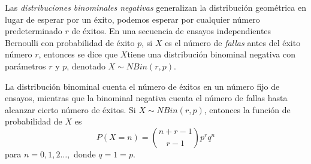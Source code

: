 Las \emph{distribuciones binominales negativas} generalizan la distribución geométrica en lugar de esperar por un éxito, podemos esperar por cualquier número predeterminado $r$ de éxitos. En una secuencia de ensayos independientes Bernoulli con probabilidad de éxito $p$, si $X$ es el número de \emph{fallas} antes del éxito número $r$, entonces se dice que $X$tiene una distribución binominal negativa con parámetros $r$ y $p$, denotado $X\sim NBin(r,p)$.

La distribución binominal cuenta el número de éxitos en un número fijo de ensayos, mientras que la binominal negativa cuenta el número de fallas hasta alcanzar cierto número de éxitos. Si $X\sim NBin(r,p)$, entonces la función de probabilidad de $X$ es
\begin{equation}
P(X=n)=\binom{n+r-1}{r-1}p^rq^n
\end{equation}
para $n=0,1,2\ldots,$ donde $q=1=p$.

